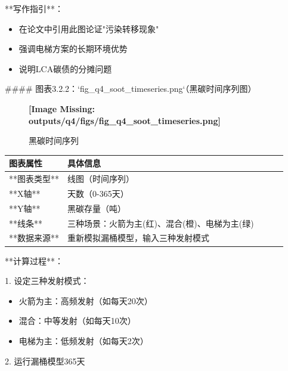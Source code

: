 \documentclass[a4paper,12pt]{article}
\begin{document}
\par
**写作指引**：

\par
\begin{itemize}
\item 在论文中引用此图论证"污染转移现象"
\end{itemize}
\begin{itemize}
\item 强调电梯方案的长期环境优势
\end{itemize}
\begin{itemize}
\item 说明LCA碳债的分摊问题
\end{itemize}
#### 图表3.2.2：`fig\_q4\_soot\_timeseries.png`（黑碳时间序列图）

\par
\begin{figure}[h!]
\centering
\textbf{[Image Missing: outputs/q4/figs/fig_q4_soot_timeseries.png]}
\caption{黑碳时间序列}
\end{figure}
\begin{center}
\begin{longtable}{|l|l|l|l|l|}
\hline
图表属性 & 具体信息 \\ \hline
**图表类型** & 线图（时间序列） \\ \hline
**X轴** & 天数（0-365天） \\ \hline
**Y轴** & 黑碳存量（吨） \\ \hline
**线条** & 三种场景：火箭为主(红)、混合(橙)、电梯为主(绿) \\ \hline
**数据来源** & 重新模拟漏桶模型，输入三种发射模式 \\ \hline
\end{longtable}
\end{center}
**计算过程**：

\par
1. 设定三种发射模式：

\par
\begin{itemize}
\item 火箭为主：高频发射（如每天20次）
\end{itemize}
\begin{itemize}
\item 混合：中等发射（如每天10次）
\end{itemize}
\begin{itemize}
\item 电梯为主：低频发射（如每天2次）
\end{itemize}
2. 运行漏桶模型365天
\end{document}
